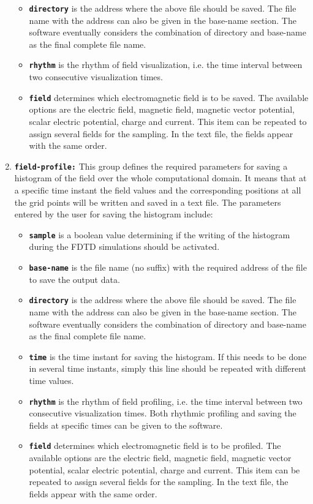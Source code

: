 \begin{enumerate}
\begin{itemize}
	\item \textbf{\texttt{directory}} is the address where the above file should be saved. The file name with the address can also be given in the base-name section. The software eventually considers the combination of directory and base-name as the final complete file name.
	\item \textbf{\texttt{rhythm}} is the rhythm of field visualization, i.e. the time interval between two consecutive visualization times.
	\item \textbf{\texttt{field}} determines which electromagnetic field is to be saved. The available options are the electric field, magnetic field, magnetic vector potential, scalar electric potential, charge and current. This item can be repeated to assign several fields for the sampling. In the text file, the fields appear with the same order.
\end{itemize}
\item \textbf{\texttt{field-profile:}} This group defines the required parameters for saving a histogram of the field over the whole computational domain. It means that at a specific time instant the field values and the corresponding positions at all the grid points will be written and saved in a text file. The parameters entered by the user for saving the histogram include:
\begin{itemize}
	\item \textbf{\texttt{sample}} is a boolean value determining if the writing of the histogram during the FDTD simulations should be activated.
	\item \textbf{\texttt{base-name}} is the file name (no suffix) with the required address of the file to save the output data.
	\item \textbf{\texttt{directory}} is the address where the above file should be saved. The file name with the address can also be given in the base-name section. The software eventually considers the combination of directory and base-name as the final complete file name.
	\item \textbf{\texttt{time}} is the time instant for saving the histogram. If this needs to be done in several time instants, simply this line should be repeated with different time values.
	\item \textbf{\texttt{rhythm}} is the rhythm of field profiling, i.e. the time interval between two consecutive visualization times. Both rhythmic profiling and saving the fields at specific times can be given to the software.
	\item \textbf{\texttt{field}} determines which electromagnetic field is to be profiled. The available options are the electric field, magnetic field, magnetic vector potential, scalar electric potential, charge and current. This item can be repeated to assign several fields for the sampling. In the text file, the fields appear with the same order.
\end{itemize}
\end{enumerate}

